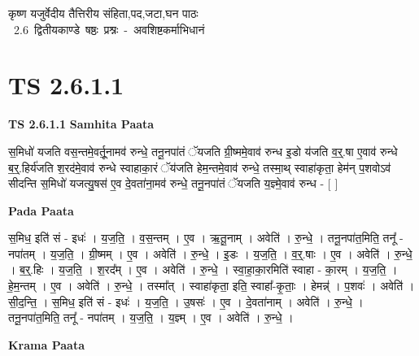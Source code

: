 \documentclass[17pt]{extarticle}
\begin{document}
\begin{titlepage}
    \begin{center}
 
\begin{sanskrit}
    { \Large
    कृष्ण यजुर्वेदीय तैत्तिरीय संहिता,पद,जटा,घन पाठः 
    }
    \\
    \vspace{2.5cm}
    \mbox{ \Large
    2.6      द्वितीयकाण्डे षष्ठः प्रश्नः - अवशिष्टकर्माभिधानं   }
\end{sanskrit}
\end{center}

\end{titlepage}
\tableofcontents
{}
\pagebreak


\section{ TS 2.6.1.1 }

\textbf{TS 2.6.1.1 } \newline
\textbf{Samhita Paata} \newline

स॒मिधो॑ यजति वस॒न्तमे॒वर्तू॒नामव॑ रुन्धे॒ तनू॒नपा॑तं ॅयजति ग्री॒ष्ममे॒वाव॑ रुन्ध इ॒डो य॑जति व॒र्॒.षा ए॒वाव॑ रुन्धे ब॒र्॒.हिर्य॑जति श॒रद॑मे॒वाव॑ रुन्धे स्वाहाका॒रं ॅय॑जति हेम॒न्तमे॒वाव॑ रुन्धे॒ तस्मा॒थ् स्वाहा॑कृता॒ हेम॑न् प॒शवोऽव॑ सीदन्ति स॒मिधो॑ यजत्यु॒षस॑ ए॒व दे॒वता॑ना॒मव॑ रुन्धे॒ तनू॒नपा॑तं ॅयजति य॒ज्ञ्मे॒वाव॑ रुन्ध - [  ] \newline

\textbf{Pada Paata} \newline

स॒मिध॒ इति॑ सं - इधः॑ । य॒ज॒ति॒ । व॒स॒न्तम् । ए॒व । ऋ॒तू॒नाम् । अवेति॑ । रु॒न्धे॒ । तनू॒नपा॑त॒मिति॒ तनू᳚ - नपा॑तम् । य॒ज॒ति॒ । ग्री॒ष्मम् । ए॒व । अवेति॑ । रु॒न्धे॒ । इ॒डः । य॒ज॒ति॒ । व॒र्॒.षाः । ए॒व । अवेति॑ । रु॒न्धे॒ । ब॒र्॒.हिः । य॒ज॒ति॒ । श॒रद᳚म् । ए॒व । अवेति॑ । रु॒न्धे॒ । स्वा॒हा॒का॒रमिति॑ स्वाहा - का॒रम् । य॒ज॒ति॒ । हे॒म॒न्तम् । ए॒व । अवेति॑ । रु॒न्धे॒ । तस्मा᳚त् । स्वाहा॑कृता॒ इति॒ स्वाहा᳚-कृ॒ताः॒ । हेमन्न्॑ । प॒शवः॑ । अवेति॑ । सी॒द॒न्ति॒ । स॒मिध॒ इति॑ सं - इधः॑ । य॒ज॒ति॒ । उ॒षसः॑ । ए॒व । दे॒वता॑नाम् । अवेति॑ । रु॒न्धे॒ । तनू॒नपा॑त॒मिति॒ तनू᳚ - नपा॑तम् । य॒ज॒ति॒ । य॒ज्ञ्म् । ए॒व । अवेति॑ । रु॒न्धे॒ ।  \newline


\textbf{Krama Paata} \newline
\end{document}
